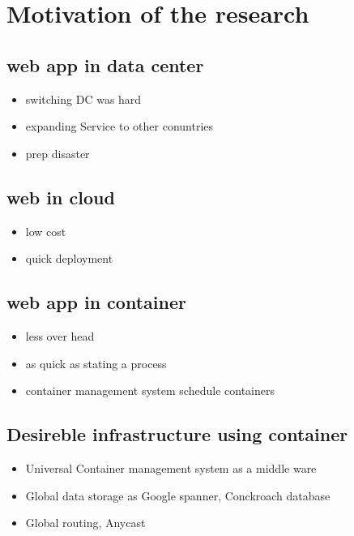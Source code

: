 
\section{Motivation of the research}

\subsection{web app in data center}

\begin{itemize}
\item switching DC was hard 
\item expanding Service to other conuntries
\item prep disaster
\end{itemize}

\subsection{web in cloud}

\begin{itemize}
\item low cost
\item quick deployment
\end{itemize}

\subsection{web app in container}

\begin{itemize}
\item less over head
\item as quick as stating a process
\item container management system schedule containers
\end{itemize}

\subsection{Desireble infrastructure using container}

\begin{itemize}
\item Universal Container management system as a middle ware
\item Global data storage as Google spanner, Conckroach database
\item Global routing, Anycast 
\end{itemize}

